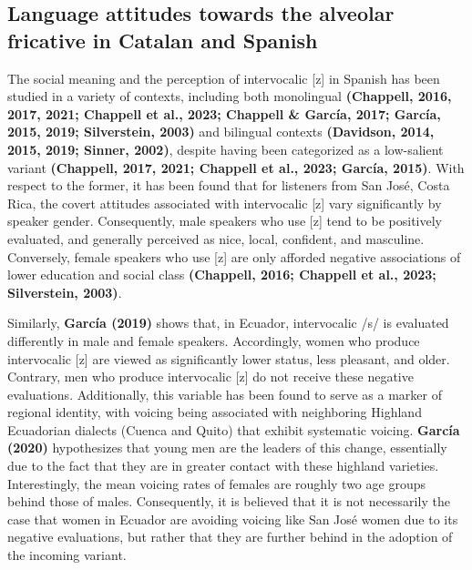 \documentclass[
  a4paper,
  11pt,
  twocolumn]{article}
\begin{document}
\subsection{Language attitudes towards the alveolar fricative in Catalan and Spanish}

The social meaning and the perception of intervocalic {[}z{]} in Spanish
has been studied in a variety of contexts, including both monolingual
\textbf{(Chappell, 2016, 2017, 2021; Chappell et al., 2023; Chappell \&
García, 2017; García, 2015, 2019; Silverstein, 2003)} and bilingual
contexts \textbf{(Davidson, 2014, 2015, 2019; Sinner, 2002)}, despite
having been categorized as a low-salient variant \textbf{(Chappell,
2017, 2021; Chappell et al., 2023; García, 2015)}. With respect to the
former, it has been found that for listeners from San José, Costa Rica,
the covert attitudes associated with intervocalic {[}z{]} vary
significantly by speaker gender. Consequently, male speakers who use
{[}z{]} tend to be positively evaluated, and generally perceived as
nice, local, confident, and masculine. Conversely, female speakers who
use {[}z{]} are only afforded negative associations of lower education
and social class \textbf{(Chappell, 2016; Chappell et al., 2023;
Silverstein, 2003)}.

Similarly, \textbf{García (2019)} shows that, in Ecuador, intervocalic
/s/ is evaluated differently in male and female speakers. Accordingly,
women who produce intervocalic {[}z{]} are viewed as significantly lower
status, less pleasant, and older. Contrary, men who produce intervocalic
{[}z{]} do not receive these negative evaluations. Additionally, this
variable has been found to serve as a marker of regional identity, with
voicing being associated with neighboring Highland Ecuadorian dialects
(Cuenca and Quito) that exhibit systematic voicing. \textbf{García
(2020)} hypothesizes that young men are the leaders of this change,
essentially due to the fact that they are in greater contact with these
highland varieties. Interestingly, the mean voicing rates of females are
roughly two age groups behind those of males. Consequently, it is
believed that it is not necessarily the case that women in Ecuador are
avoiding voicing like San José women due to its negative evaluations,
but rather that they are further behind in the adoption of the incoming
variant.
\end{document}
